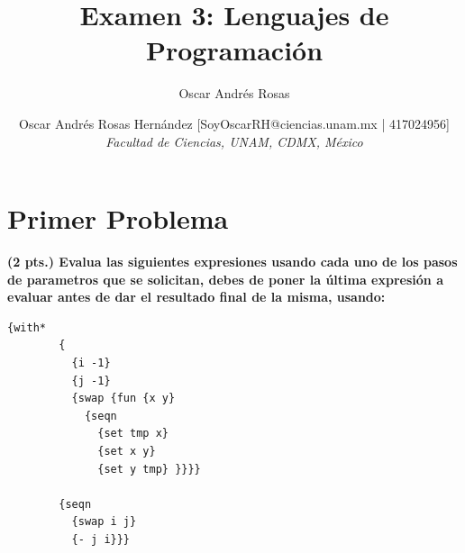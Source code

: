 \documentclass[journal,12pt,onecolumn]{IEEEtran}                %
\author{Oscar Andrés Rosas}                                     %
\theoremstyle{break}                                            %
\begin{document}
\title{Examen 3: Lenguajes de Programación}

\author{
   Oscar Andrés Rosas Hernández [SoyOscarRH@ciencias.unam.mx | 417024956]                 \\
   \textit{
   Facultad de Ciencias, UNAM, CDMX, México
   }
}


\maketitle
   \section*{Primer Problema}

    \textbf{(2 pts.) Evalua las siguientes expresiones usando cada uno de 
    los pasos de parametros que se solicitan, debes de poner la última expresión 
    a evaluar antes de dar el resultado final de la misma, usando:}

    \begin{lstlisting}[gobble=6]
      {with* 
        {
          {i -1} 
          {j -1}
          {swap {fun {x y}
            {seqn 
              {set tmp x}
              {set x y}
              {set y tmp} }}}}

        {seqn 
          {swap i j}
          {- j i}}}
    \end{lstlisting}
\end{document}
